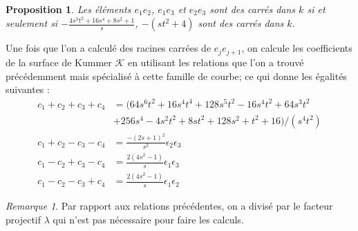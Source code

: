 \documentclass[a4paper,12pt]{article}
\newtheorem{proposition}[theoreme]{Proposition}
\theoremstyle{definition}
\theoremstyle{remark}
\newtheorem{remarque}{Remarque}
\numberwithin{equation}{section}
\begin{document}
\begin{proposition}
Les éléments $e_1e_2$, $e_1e_3$ et $e_2e_3$ sont des carrés dans $k$ si et seulement si
$-\frac{4s^3t^2 + 16s^4 + 8s^2 + 1}{s}$, $-(st^2+4)$ sont des carrés dans $k$.
\end{proposition}

Une fois que l'on a calculé des racines carrées de $e_je_{j+1}$, on calcule les coefficients de la surface de Kummer $\mathcal{K}$ en utilisant les relations que l'on a trouvé précédemment mais spécialisé à cette famille de courbe; ce qui donne les égalités suivantes :
\begin{align*}
c_1+c_2+c_3+c_4 &= (64s^6t^2 + 16s^4t^4 + 128s^5t^2 - 16s^4t^2 + 64s^3t^2 \\
    & + 256s^4 - 4s^2t^2 + 8st^2 + 128s^2 + t^2 + 16)/(s^4t^2) \\
c_1+c_2-c_3-c_4 &= \frac{-(2s + 1)^2}{s^2}\epsilon_2\epsilon_3 \\
c_1-c_2+c_3-c_4 &= \frac{2(4s^2 - 1)}{s}\epsilon_1\epsilon_3 \\
c_1-c_2-c_3+c_4 &= \frac{2(4s^2 - 1)}{s}\epsilon_1\epsilon_2
\end{align*}

\begin{remarque}
Par rapport aux relations précédentes, on a divisé par le facteur projectif $\lambda$ qui n'est pas nécessaire pour faire les calculs.
\end{remarque}

\end{document}
